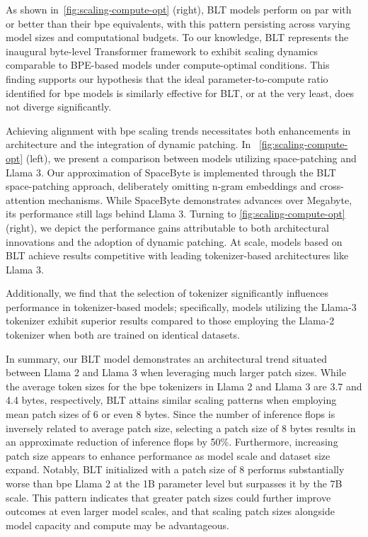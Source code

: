 As shown in~\autoref{fig:scaling-compute-opt} (right), {\textsc BLT} models perform on par with or better than their bpe equivalents, with this pattern persisting across varying model sizes and computational budgets. To our knowledge, {\textsc BLT} represents the inaugural byte-level Transformer framework to exhibit scaling dynamics comparable to BPE-based models under compute-optimal conditions. This finding supports our hypothesis that the ideal parameter-to-compute ratio identified for bpe models is similarly effective for {\textsc BLT}, or at the very least, does not diverge significantly.

Achieving alignment with bpe scaling trends necessitates both enhancements in architecture and the integration of dynamic patching. In ~\autoref{fig:scaling-compute-opt} (left), we present a comparison between models utilizing space-patching and Llama 3. Our approximation of SpaceByte \citep{slagle2024spacebyte} is implemented through the {\textsc BLT} space-patching approach, deliberately omitting n-gram embeddings and cross-attention mechanisms. While SpaceByte demonstrates advances over Megabyte, its performance still lags behind Llama 3. Turning to \autoref{fig:scaling-compute-opt} (right), we depict the performance gains attributable to both architectural innovations and the adoption of dynamic patching. At scale, models based on {\textsc BLT} achieve results competitive with leading tokenizer-based architectures like Llama 3.

Additionally, we find that the selection of tokenizer significantly influences performance in tokenizer-based models; specifically, models utilizing the Llama-3 tokenizer exhibit superior results compared to those employing the Llama-2 tokenizer when both are trained on identical datasets.

In summary, our {\textsc BLT} model demonstrates an architectural trend situated between Llama 2 and Llama 3 when leveraging much larger patch sizes. While the average token sizes for the bpe tokenizers in Llama 2 and Llama 3 are 3.7 and 4.4 bytes, respectively, {\textsc BLT} attains similar scaling patterns when employing mean patch sizes of 6 or even 8 bytes. Since the number of inference flops is inversely related to average patch size, selecting a patch size of 8 bytes results in an approximate reduction of inference flops by 50\%. Furthermore, increasing patch size appears to enhance performance as model scale and dataset size expand. Notably, {\textsc BLT} initialized with a patch size of 8 performs substantially worse than bpe Llama 2 at the 1B parameter level but surpasses it by the 7B scale. This pattern indicates that greater patch sizes could further improve outcomes at even larger model scales, and that scaling patch sizes alongside model capacity and compute may be advantageous.

